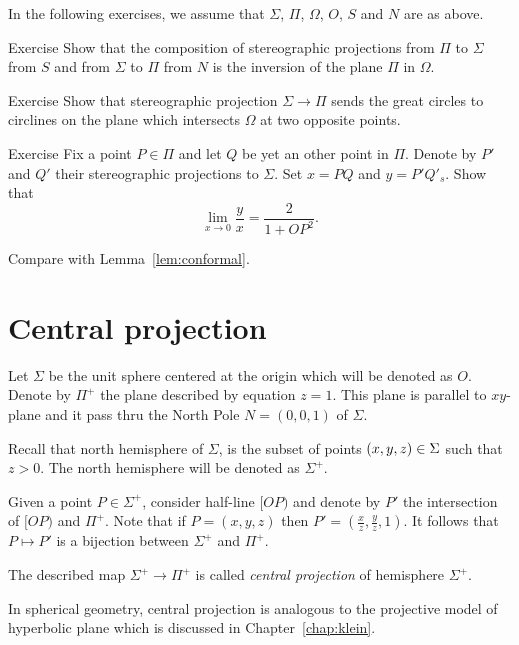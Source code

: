 In the following exercises,
we assume that $\Sigma$, $\Pi$, $\Omega$, $O$, $S$ and $N$ are as above.
  
\begin{thm}{Exercise}\label{ex:two-stereographics}
Show that the composition of stereographic projections 
from $\Pi$ to $\Sigma$ from  $S$ and
from $\Sigma$ to $\Pi$ from  $N$ is 
the inversion of the plane $\Pi$ in $\Omega$.
\end{thm}

\begin{thm}{Exercise}\label{ex:great-circ}
Show that stereographic projection $\Sigma\to\Pi$
sends the great circles to circlines on the plane which intersects $\Omega$ at two opposite points.
\end{thm}

\begin{thm}{Exercise}\label{ex:conform-sphere}
Fix a point $P\in \Pi$  and let $Q$ be yet an other point in $\Pi$.
Denote by $P'$ and $Q'$ their stereographic projections to $\Sigma$.
Set $x=PQ$ and $y=P'Q'_s$.
Show that
$$\lim_{x\to 0} \frac{y}{x}=\frac{2}{1+OP^2}.$$

Compare with Lemma~\ref{lem:conformal}.
\end{thm}



\section*{Central projection}

Let $\Sigma$ be the unit sphere centered at the origin which will be denoted as $O$.
Denote by $\Pi^+$ the plane described by equation $z=1$.
This plane is parallel to $xy$-plane and it  pass thru 
the North Pole $N=(0,0,1)$ of $\Sigma$.

Recall that north hemisphere of $\Sigma$,
is the subset of points $(x,y,z)\z\in \Sigma$ such that $z>0$.
The north hemisphere will be denoted as $\Sigma^+$.

Given a point $P\in \Sigma^+$, consider half-line $[OP)$ and denote by $P'$ the intersection of $[OP)$ and $\Pi^+$.
Note that if $P=(x,y,z)$ then $P'=(\tfrac xz,\tfrac yz,1)$.
It follows that $P\mapsto P'$ is a bijection between $\Sigma^+$ and $\Pi^+$.

The described map $\Sigma^+\to \Pi^+$ is called \emph{central projection} of hemisphere $\Sigma^+$.

In spherical geometry,
central projection is analogous to
the projective model of hyperbolic plane which is discussed in Chapter~\ref{chap:klein}.

